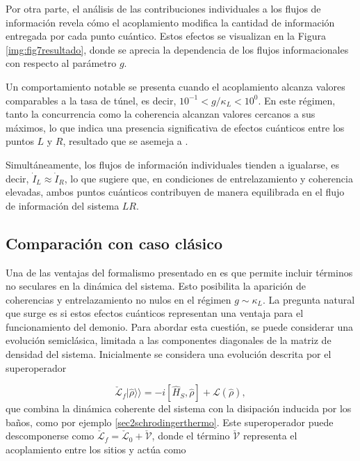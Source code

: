Por otra parte, el análisis de las contribuciones individuales a los flujos de información revela cómo el acoplamiento modifica la cantidad de información entregada por cada punto cuántico. Estos efectos se visualizan en la Figura \ref{img:fig7resultado}, donde se aprecia la dependencia de los flujos informacionales con respecto al parámetro \( g \).


Un comportamiento notable se presenta cuando el acoplamiento alcanza valores comparables a la tasa de túnel, es decir, \( 10^{-1}< g/\kappa_{L}< 10^{0} \). En este régimen, tanto la concurrencia como la coherencia alcanzan valores cercanos a sus máximos, lo que indica una presencia significativa de efectos cuánticos entre los puntos \( L \) y \( R \), resultado que se asemeja a \cite{prech2023entanglement}. 

Simultáneamente, los flujos de información individuales tienden a igualarse, es decir, \( \dot{I}_{L} \approx \dot{I}_{R} \), lo que sugiere que, en condiciones de entrelazamiento y coherencia elevadas, ambos puntos cuánticos contribuyen de manera equilibrada en el flujo de información del sistema $LR$. 

\label{sec5:demonio1}

\newpage 

\subsection{Comparación con caso clásico}
Una de las ventajas del formalismo presentado en \cite{potts2021thermodynamically} es que permite incluir términos no seculares en la dinámica del sistema. Esto posibilita la aparición de coherencias y entrelazamiento no nulos en el régimen \( g \sim \kappa_{L} \). La pregunta natural que surge es si estos efectos cuánticos representan una ventaja para el funcionamiento del demonio. Para abordar esta cuestión, se puede considerar una evolución semiclásica, limitada a las componentes diagonales de la matriz de densidad del sistema. Inicialmente se considera una evolución descrita por el superoperador

\begin{equation*}
\check{\mathcal{L}}_{f}|\hat{\rho}\rangle\rangle = -i[\hat{H}_{S}, \hat{\rho}] + \mathcal{L}(\hat{\rho}),
\end{equation*}
que combina la dinámica coherente del sistema con la disipación inducida por los baños, como por ejemplo \ref{sec2schrodingerthermo}. Este superoperador puede descomponerse como $\check{\mathcal{L}}_{f} = \check{\mathcal{L}}_{0} + \check{\mathcal{V}}$, donde el término $\check{\mathcal{V}}$ representa el acoplamiento entre los sitios y actúa como


